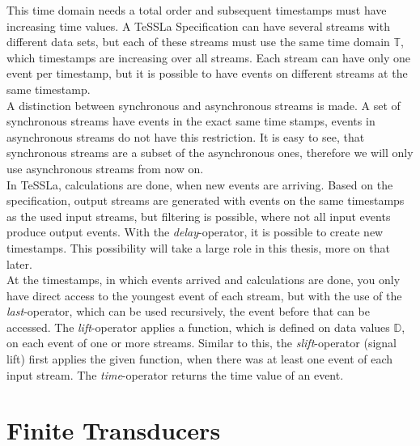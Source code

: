 This time domain needs a total order and subsequent timestamps must have increasing time values. A TeSSLa Specification can have several streams with different data sets, but each of these streams must use the same time domain $\mathbb T$, which timestamps are increasing over all streams. Each stream can have only one event per timestamp, but it is possible to have events on different streams at the same timestamp.\\
A distinction between synchronous and asynchronous streams is made. A set of synchronous streams have events in the exact same time stamps, events in asynchronous streams do not have this restriction. It is easy to see, that synchronous streams are a subset of the asynchronous ones, therefore we will only use asynchronous streams from now on.\\
In TeSSLa, calculations are done, when new events are arriving. Based on the specification, output streams are generated with events on the same timestamps as the used input streams, but filtering is possible, where not all input events produce output events. With the \emph{delay}-operator, it is possible to create new timestamps. This possibility will take a large role in this thesis, more on that later.\\
At the timestamps, in which events arrived and calculations are done, you only have direct access to the youngest event of each stream, but with the use of the \emph{last}-operator, which can be used recursively, the event before that can be accessed. The \emph{lift}-operator applies a function, which is defined on data values $\mathbb D$, on each event of one or more streams. Similar to this, the \emph{slift}-operator (signal lift) first applies the given function, when there was at least one event of each input stream. The \emph{time}-operator returns the time value of an event.\\


\section{Finite Transducers}

